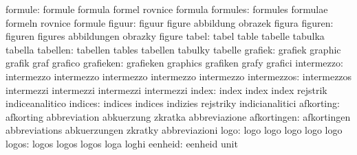                   formule: formule                   formula
                           formel                    rovnice
                           formula
                 formules: formules                  formulae
                           formeln                   rovnice
                           formule
                   figuur: figuur                    figure
                           abbildung                 obrazek
                           figura
                  figuren: figuren                   figures
                           abbildungen               obrazky
                           figure
                    tabel: tabel                     table
                           tabelle                   tabulka
                           tabella
                 tabellen: tabellen                  tables
                           tabellen                  tabulky
                           tabelle
                  grafiek: grafiek                   graphic
                           grafik                    graf
                           grafico
                grafieken: grafieken                 graphics
                           grafiken                  grafy
                           grafici
               intermezzo: intermezzo                intermezzo
                           intermezzo                intermezzo
                           intermezzo
              intermezzos: intermezzos               intermezzi
                           intermezzi                intermezzi
                           intermezzi
                    index: index                     index
                           index                     rejstrik
                           indiceanalitico
                  indices: indices                   indices
                           indizies                  rejstriky
                           indicianalitici
                afkorting: afkorting                 abbreviation
                           abkuerzung                zkratka
                           abbreviazione
              afkortingen: afkortingen               abbreviations
                           abkuerzungen              zkratky
                           abbreviazioni
                     logo: logo                      logo
                           logo                      logo
                           logo
                    logos: logos                     logos
                           logos                     loga
                           loghi
                  eenheid: eenheid                   unit
